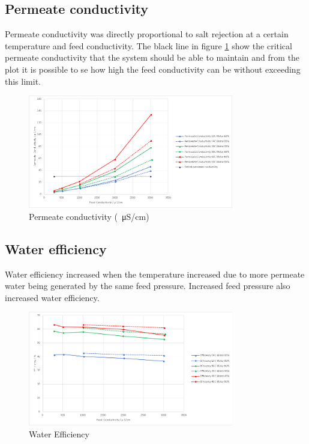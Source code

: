 \subsection{Permeate conductivity}

Permeate conductivity was directly proportional to salt rejection at a certain temperature and feed conductivity. The black line in figure \ref{fig:Permeatecond} show the critical permeate conductivity that the system should be able to maintain and from the plot it is possible to se how high the feed conductivity can be without exceeding this limit.

\begin{figure}[H]
    \centering
    \includegraphics[width=0.8\textwidth]{PermCond}
    \caption{Permeate conductivity (\SI{}{\micro\siemens}/cm)}
    \label{fig:Permeatecond}
\end{figure}


\subsection{Water efficiency}

Water efficiency increased when the temperature increased due to more permeate water being generated by the same feed pressure. Increased feed pressure also increased water efficiency. 

\begin{figure}[H]
    \centering
    \includegraphics[width=0.8\textwidth]{Efficiency}
    \caption{Water Efficiency}
    \label{fig:Weff}
\end{figure}


